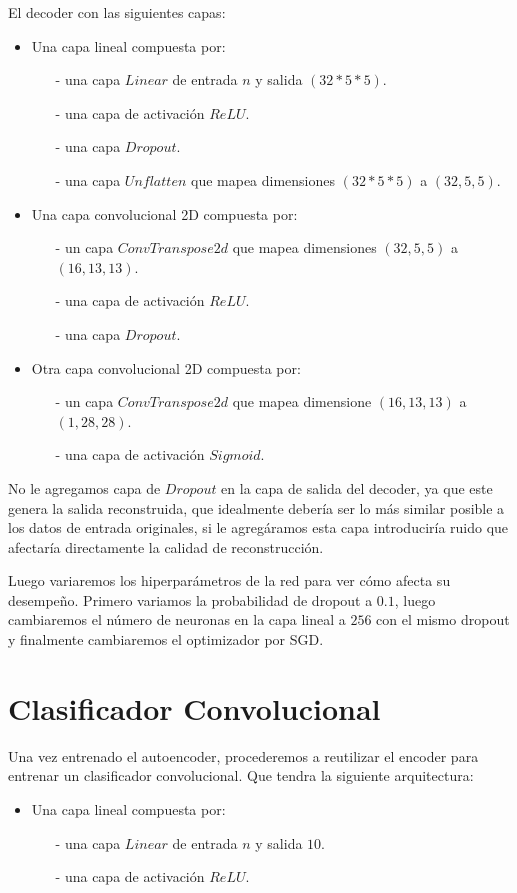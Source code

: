 \documentclass[aps,prl,reprint,groupedaddress]{revtex4-2}
\begin{document}
El decoder con las siguientes capas:
\begin{itemize}
  \item Una capa lineal compuesta por:
  \begin{itemize}
    \item [-] una capa $Linear$ de entrada $n$ y salida $(32*5*5)$.
    \item [-] una capa de activación $ReLU$.
    \item [-] una capa $Dropout$.
    \item [-] una capa $Unflatten$ que mapea dimensiones $(32*5*5)$ a $(32, 5, 5)$.
  \end{itemize}
  \item Una capa convolucional 2D compuesta por:
  \begin{itemize}
    \item [-] un capa $ConvTranspose2d$ que mapea dimensiones $(32, 5, 5)$ a
    $(16, 13, 13)$.
    \item [-] una capa de activación $ReLU$.
    \item [-] una capa $Dropout$.
  \end{itemize}
  \item Otra capa convolucional 2D compuesta por:
  \begin{itemize}
    \item [-] un capa $ConvTranspose2d$ que mapea dimensione $(16, 13, 13)$ a
    $(1, 28, 28)$.
    \item [-] una capa de activación $Sigmoid$.
  \end{itemize}
\end{itemize}

No le agregamos capa de $Dropout$ en la capa de salida del decoder, ya que 
este genera la salida reconstruida, que idealmente debería ser lo más similar 
posible a los datos de entrada originales, si le agregáramos esta capa 
introduciría ruido que afectaría directamente la calidad de reconstrucción.

Luego variaremos los hiperparámetros de la red para ver cómo afecta su 
desempeño. Primero variamos la probabilidad de dropout a $0.1$, luego
cambiaremos el número de neuronas en la capa lineal a $256$ con el mismo 
dropout y finalmente cambiaremos el optimizador por SGD.

\section{Clasificador Convolucional}
Una vez entrenado el autoencoder, procederemos a reutilizar el encoder para
entrenar un clasificador convolucional. Que tendra la siguiente arquitectura:
\begin{itemize}
  \item Una capa lineal compuesta por:
  \begin{itemize}
    \item [-] una capa $Linear$ de entrada $n$ y salida $10$.
    \item [-] una capa de activación $ReLU$.
  \end{itemize}
\end{itemize}
\end{document}
